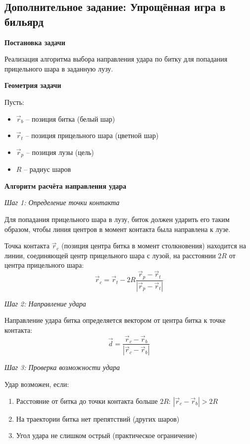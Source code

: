 \begin{center}
    \subsection{Дополнительное задание: Упрощённая игра в бильярд}
\end{center}

\begin{center}
    \textbf{Постановка задачи}
\end{center}

Реализация алгоритма выбора направления удара по битку для попадания прицельного шара в заданную лузу.

\begin{center}
    \textbf{Геометрия задачи}
\end{center}

Пусть:
\begin{itemize}
    \item $\vec{r}_b$ -- позиция битка (белый шар)
    \item $\vec{r}_t$ -- позиция прицельного шара (цветной шар)
    \item $\vec{r}_p$ -- позиция лузы (цель)
    \item $R$ -- радиус шаров
\end{itemize}

\begin{center}
    \textbf{Алгоритм расчёта направления удара}
\end{center}

\textit{Шаг 1: Определение точки контакта}

Для попадания прицельного шара в лузу, биток должен ударить его таким образом, чтобы линия центров в момент контакта была направлена к лузе.

Точка контакта $\vec{r}_c$ (позиция центра битка в момент столкновения) находится на линии, соединяющей центр прицельного шара с лузой, на расстоянии $2R$ от центра прицельного шара:
\[
\vec{r}_c = \vec{r}_t - 2R \frac{\vec{r}_p - \vec{r}_t}{|\vec{r}_p - \vec{r}_t|}
\]

\textit{Шаг 2: Направление удара}

Направление удара битка определяется вектором от центра битка к точке контакта:
\[
\vec{d} = \frac{\vec{r}_c - \vec{r}_b}{|\vec{r}_c - \vec{r}_b|}
\]

\textit{Шаг 3: Проверка возможности удара}

Удар возможен, если:
\begin{enumerate}
    \item Расстояние от битка до точки контакта больше $2R$: $|\vec{r}_c - \vec{r}_b| > 2R$
    \item На траектории битка нет препятствий (других шаров)
    \item Угол удара не слишком острый (практическое ограничение)
\end{enumerate}

